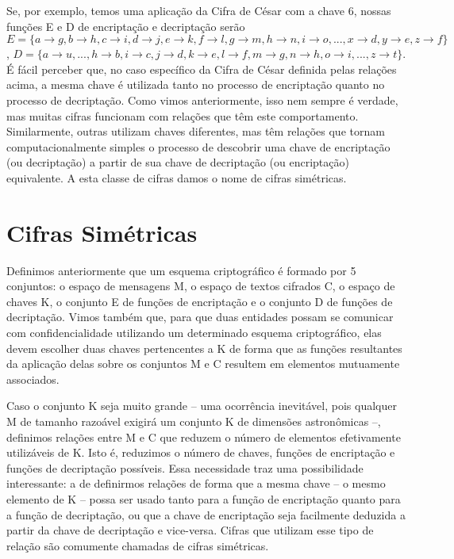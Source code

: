 \documentclass[
	10pt,				%
	openright,			%
	twoside,			%
	a5paper,			%
	english,			%
	french,				%
	spanish,			%
	brazil,				%
	sumario=tradicional
]{abntex2}
\begin{document}
Se, por exemplo, temos uma aplicação da Cifra de César com a chave 6, nossas funções E e D de encriptação e decriptação serão $E = \{ a \to g, b \to h, c \to i, d \to j, e \to k, f \to l, g \to m, h \to n, i \to o, ... , x \to d, y \to e, z \to f \}$, $D = \{ a \to u, ..., h \to b, i \to c, j \to d, k \to e, l \to f, m \to g, n \to h, o \to i, ..., z \to t \}$. É fácil perceber que, no caso específico da Cifra de César definida pelas relações acima, a mesma chave é utilizada tanto no processo de encriptação quanto no processo de decriptação. Como vimos anteriormente, isso nem sempre é verdade, mas muitas cifras funcionam com relações que têm este comportamento. Similarmente, outras utilizam chaves diferentes, mas têm relações que tornam computacionalmente simples o processo de descobrir uma chave de encriptação (ou decriptação) a partir de sua chave de decriptação (ou encriptação) equivalente. A esta classe de cifras damos o nome de cifras simétricas.

\section{Cifras Simétricas}

Definimos anteriormente que um esquema criptográfico é formado por 5 conjuntos: o espaço de mensagens M, o espaço de textos cifrados C, o espaço de chaves K, o conjunto E de funções de encriptação e o conjunto D de funções de decriptação. Vimos também que, para que duas entidades possam se comunicar com confidencialidade utilizando um determinado esquema criptográfico, elas devem escolher duas chaves pertencentes a K de forma que as funções resultantes da aplicação delas sobre os conjuntos M e C resultem em elementos mutuamente associados.

Caso o conjunto K seja muito grande – uma ocorrência inevitável, pois qualquer M de tamanho razoável exigirá um conjunto K de dimensões astronômicas –, definimos relações entre M e C que reduzem o número de elementos efetivamente utilizáveis de K. Isto é, reduzimos o número de chaves, funções de encriptação e funções de decriptação possíveis. Essa necessidade traz uma possibilidade interessante: a de definirmos relações de forma que a mesma chave – o mesmo elemento de K – possa ser usado tanto para a função de encriptação quanto para a função de decriptação, ou que a chave de encriptação seja facilmente deduzida a partir da chave de decriptação e vice-versa. Cifras que utilizam esse tipo de relação são comumente chamadas de cifras simétricas.
\end{document}
